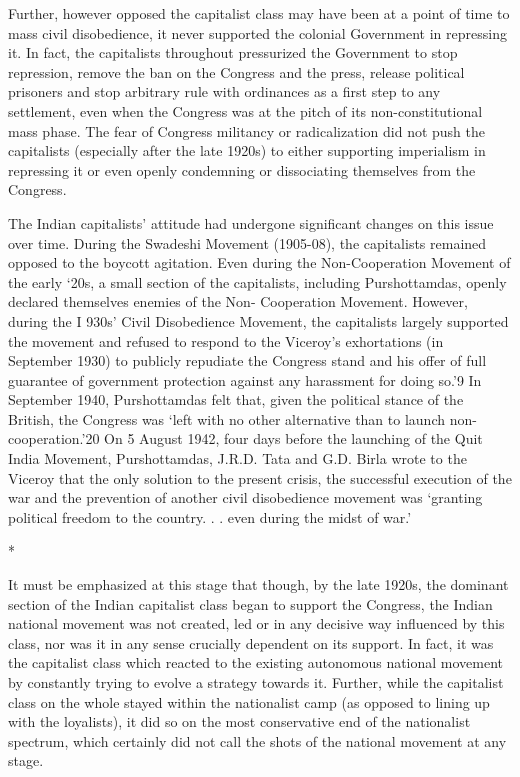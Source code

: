 Further, however opposed the capitalist class may have been at a point of time to mass civil disobedience, it never supported the colonial Government in repressing it. In fact, the capitalists throughout pressurized the Government to stop repression, remove the ban on the Congress and the press, release political prisoners and stop arbitrary rule with ordinances as a first step to any settlement, even when the Congress was at the pitch of its non-constitutional mass phase. The fear of Congress militancy or radicalization did not push the capitalists (especially after the late 1920s) to either supporting imperialism in repressing it or even openly condemning or dissociating themselves from the Congress. 

The Indian capitalists’ attitude had undergone significant changes on this issue over time. During the Swadeshi Movement (1905-08), the capitalists remained opposed to the boycott agitation. Even during the Non-Cooperation Movement of the early ‘20s, a small section of the capitalists, including Purshottamdas, openly declared themselves enemies of the Non- Cooperation Movement. However, during the I 930s’ Civil Disobedience Movement, the capitalists largely supported the movement and refused to respond to the Viceroy’s exhortations (in September 1930) to publicly repudiate the Congress stand and his offer of full guarantee of government protection against any harassment for doing so.’9 In September 1940, Purshottamdas felt that, given the political stance of the British, the Congress was ‘left with no other alternative than to launch non-cooperation.’20 On 5 August 1942, four days before the launching of the Quit India Movement, Purshottamdas, J.R.D. Tata and G.D. Birla wrote to the Viceroy that the only solution to the present crisis, the successful execution of the war and the prevention of another civil disobedience movement was ‘granting political freedom to the country. . . even during the midst of war.’

\begin{center}*\end{center}



It must be emphasized at this stage that though, by the late 1920s, the dominant section of the Indian capitalist class began to support the Congress, the Indian national movement was not created, led or in any decisive way influenced by this class, nor was it in any sense crucially dependent on its support. In fact, it was the capitalist class which reacted to the existing autonomous national movement by constantly trying to evolve a strategy towards it. Further, while the capitalist class on the whole stayed within the nationalist camp (as opposed to lining up with the loyalists), it did so on the most conservative end of the nationalist spectrum, which certainly did not call the shots of the national movement at any stage. 

